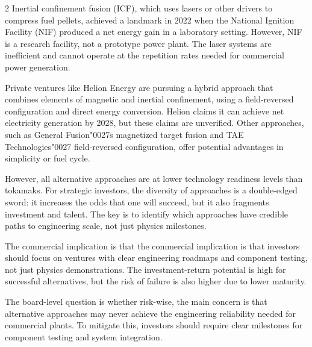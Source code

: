 \documentclass[10pt,a4paper]{article}
\newcommand{\BOApos}{{\BOQuoteFont\char"0027}}
\begin{document}
\begin{multicols}{2}
{\small Inertial confinement fusion (ICF), which uses lasers or other drivers to compress fuel pellets, achieved a landmark in 2022 when the National Ignition Facility (NIF) produced a net energy gain in a laboratory setting. However, NIF is a research facility, not a prototype power plant. The laser systems are inefficient and cannot operate at the repetition rates needed for commercial power generation.}\par
{\small Private ventures like Helion Energy are pursuing a hybrid approach that combines elements of magnetic and inertial confinement, using a field-reversed configuration and direct energy conversion. Helion claims it can achieve net electricity generation by 2028, but these claims are unverified. Other approaches, such as General Fusion\BOApos{}s magnetized target fusion and TAE Technologies\BOApos{} field-reversed configuration, offer potential advantages in simplicity or fuel cycle.}\par
{\small However, all alternative approaches are at lower technology readiness levels than tokamaks. For strategic investors, the diversity of approaches is a double-edged sword: it increases the odds that one will succeed, but it also fragments investment and talent. The key is to identify which approaches have credible paths to engineering scale, not just physics milestones.}\par
{\small The commercial implication is that the commercial implication is that investors should focus on ventures with clear engineering roadmaps and component testing, not just physics demonstrations. The investment-return potential is high for successful alternatives, but the risk of failure is also higher due to lower maturity.}\par
{\small The board-level question is whether risk-wise, the main concern is that alternative approaches may never achieve the engineering reliability needed for commercial plants. To mitigate this, investors should require clear milestones for component testing and system integration.}\par
\end{multicols}
\label{chap:3:end}
\end{document}
